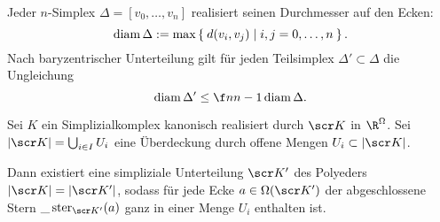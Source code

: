\begin{lem}
	Jeder $n$-Simplex $\Delta = [v_0, \dotsc, v_n]$ realisiert seinen Durchmesser auf den Ecken:
	\[
		\operatorname{diam} \Delta := \max \Set{ d(v_i, v_j) | i,j = 0, \dotsc, n }.
	\]
	Nach baryzentrischer Unterteilung gilt für jeden Teilsimplex $\Delta' \subset \Delta$ die Ungleichung
	\[
		\diam \Delta' \le \f n{n-1} \diam \Delta.
	\]
\end{lem}

\begin{st}
	Sei $K$ ein Simplizialkomplex kanonisch realisiert durch $\scr K$ in $\R^\Omega$.
	Sei $|\scr K| = \bigcup_{i\in I} U_i$ eine Überdeckung durch offene Mengen $U_i \subset |\scr K|$.

	Dann existiert eine simpliziale Unterteilung $\scr K'$ des Polyeders $|\scr K| = |\scr K'|$, sodass für jede Ecke $a \in \Omega(\scr K')$ der abgeschlossene Stern $\_\stern_{\scr K'}(a)$ ganz in einer Menge $U_i$ enthalten ist.
\end{st}
